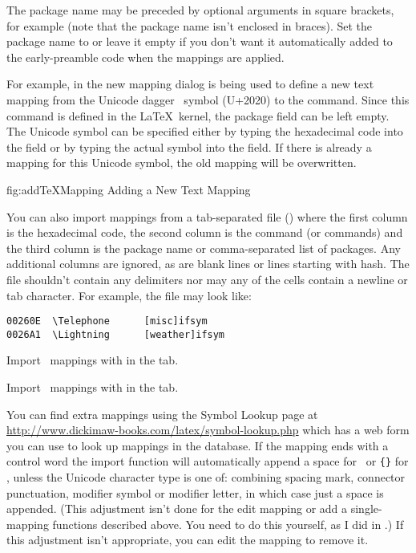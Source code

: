 The package name may be preceded by optional arguments in square
brackets, for example  (note that the package name
isn't enclosed in braces). Set the package name to  or
leave it empty if you don't want it automatically added to the
\gls{early-preamble} code when the mappings are applied.

For example, in  the new mapping dialog
is being used to define a new text mapping from the Unicode dagger
\textdagger\ symbol (U+2020) to the  command.
Since this command is defined in the \LaTeX\ kernel, the package
field can be left empty. The Unicode symbol can be specified either
by typing the hexadecimal code into the
 field or by typing the actual
symbol into the  field. If there
is already a mapping for this Unicode symbol, the old mapping will
be overwritten.

\FloatFig
  {fig:addTeXMapping}
  {}
  {Adding a New Text Mapping} 

You can also import mappings from a tab-separated file ()
where the first column is the hexadecimal code, the second column is
the command (or commands) and the third column is the package name
or comma-separated list of packages. Any additional columns are
ignored, as are blank lines or lines starting with \gls{hash}. The file
shouldn't contain any delimiters nor may any of
the cells contain a newline or tab character. For example,
the file may look like:
\begin{verbatim}
00260E  \Telephone      [misc]ifsym
0026A1  \Lightning      [weather]ifsym
\end{verbatim}

Import \textmode\ mappings with 
in the  tab.

Import \mathsmode\ mappings with 
in the  tab.

You can find extra mappings using the Symbol Lookup page at
\url{http://www.dickimaw-books.com/latex/symbol-lookup.php} which
has a web form you can use to look up mappings in the database.  If
the mapping ends with a control word the import function will
automatically append a space for \mathsmode\ or
\verb|{}| for \textmode, unless the Unicode character type is one
of: combining spacing mark, connector punctuation, modifier symbol
or modifier letter, in which case just a space is appended.
(This adjustment isn't done for the edit mapping or
add a single-mapping functions described above. You need to do this
yourself, as I did in .) If this
adjustment isn't appropriate, you can edit the mapping to remove it.


